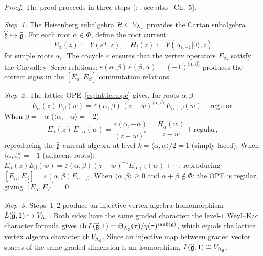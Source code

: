 \begin{proof}
The proof proceeds in three steps (\cite{FK80}; \cite{Se81};
see also \cite{Kac}~Ch.~5).

\emph{Step~1.}
The Heisenberg subalgebra $\mathcal{H} \subset V_{\Lambda_{\mathfrak{g}}}$ provides
the Cartan subalgebra $\widehat{\mathfrak{h}} \hookrightarrow \widehat{\mathfrak{g}}$.
For each root $\alpha \in \Phi$, define the root current:
\[
E_\alpha(z) := Y(e^\alpha, z), \quad
H_i(z) := Y(\alpha_{i,-1}|0\rangle, z)
\]
for simple roots $\alpha_i$.  The cocycle $\varepsilon$ ensures that
the vertex operators $E_{\alpha_i}$ satisfy the Chevalley--Serre
relations: $\varepsilon(\alpha,\beta)\,\varepsilon(\beta,\alpha) =
(-1)^{\langle\alpha,\beta\rangle}$ produces the correct signs in the
$[E_\alpha, E_\beta]$ commutation relations.

\emph{Step~2.}
The lattice OPE~\eqref{eq:lattice:ope} gives, for roots $\alpha, \beta$:
\[
E_\alpha(z)\, E_\beta(w) = \varepsilon(\alpha,\beta)\,
(z-w)^{\langle\alpha,\beta\rangle}\, E_{\alpha+\beta}(w)
+ \text{regular}.
\]
When $\beta = -\alpha$ ($\langle\alpha,-\alpha\rangle = -2$):
\[
E_\alpha(z)\, E_{-\alpha}(w)
= \frac{\varepsilon(\alpha,-\alpha)}{(z-w)^2} + \frac{H_\alpha(w)}{z-w}
+ \text{regular},
\]
reproducing the $\widehat{\mathfrak{g}}$ current algebra at level $k =
\langle\alpha,\alpha\rangle/2 = 1$ (simply-laced).  When
$\langle\alpha,\beta\rangle = -1$ (adjacent roots):
$E_\alpha(z) E_\beta(w) = \varepsilon(\alpha,\beta)(z-w)^{-1}
E_{\alpha+\beta}(w) + \cdots$, reproducing $[E_\alpha, E_\beta] =
\varepsilon(\alpha,\beta) E_{\alpha+\beta}$.  When
$\langle\alpha,\beta\rangle \geq 0$ and $\alpha+\beta \notin \Phi$:
the OPE is regular, giving $[E_\alpha, E_\beta] = 0$.

\emph{Step~3.}
Steps~1--2 produce an injective vertex algebra homomorphism
$L(\widehat{\mathfrak{g}}, 1) \hookrightarrow V_{\Lambda_{\mathfrak{g}}}$.  Both sides
have the same graded character: the level-$1$ Weyl--Kac character
formula gives $\mathrm{ch}\, L(\widehat{\mathfrak{g}}, 1) =
\Theta_{\Lambda_{\mathfrak{g}}}(\tau) / \eta(\tau)^{\mathrm{rank}(\mathfrak{g})}$, which
equals the lattice vertex algebra character $\mathrm{ch}\,
V_{\Lambda_{\mathfrak{g}}}$.  Since an injective map between graded
vector spaces of the same graded dimension is an isomorphism,
$L(\widehat{\mathfrak{g}}, 1) \cong V_{\Lambda_{\mathfrak{g}}}$.
\end{proof}


